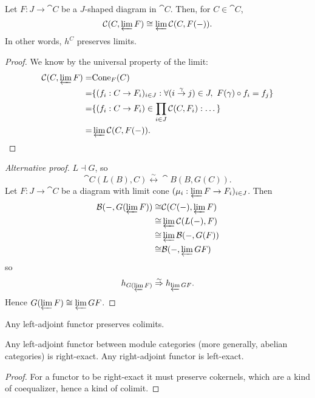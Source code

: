 \documentclass[12pt]{article}
\begin{document}
\begin{lemma}
	Let $F:J\to\cat{C}$ be a $J$-shaped diagram in $\cat{C}$. Then, for $C\in\cat{C}$,
	\begin{equation*}
		\mathcal{C}(C, \varprojlim F)\cong \varprojlim \mathcal{C}(C, F(-)).
	\end{equation*}
	In other words, $h^C$ preserves limits.
\end{lemma}
\begin{proof}
	We know by the universal property of the limit:
	\begin{align*}
		\mathcal{C}(C, \varprojlim F)
		=& \text{Cone}_F(C) \\
		=& \{(f_i:C\to F_i)_{i\in J} : \forall(i \overset{\gamma}{\to}j)\in J,\ F(\gamma)\circ f_i=f_j \} \\
		=& \{(f_i:C\to F_i)\in\prod_{i\in J}\mathcal{C}(C, F_i) : \dots \} \\
		=& \varprojlim \mathcal{C}(C, F(-)).
	\end{align*}
\end{proof}

\begin{proof}[Alternative proof]
	$L\dashv G$, so 
	\begin{equation*}
		\cat{C}(L(B), C) \overset{\sim}{\leftrightarrow} \cat{B}(B, G(C)).
	\end{equation*}
	Let $F:J\to\cat{C}$ be a diagram with limit cone $(\mu_i: \varprojlim F\to F_i)_{i\in J}$. Then 
	\begin{align*}
		\mathcal{B}(-, G(\varprojlim F)) 
		\cong& \mathcal{C}(C(-), \varprojlim F) \\
		\cong& \varprojlim \mathcal{C}(L(-), F) \\
		\cong& \varprojlim \mathcal{B}(-, G(F)) \\
		\cong& \mathcal{B}(-, \varprojlim GF)
	\end{align*}
	so 
	\begin{equation*}
		h_{G(\varprojlim F)} \overset{\sim}{\Rightarrow} h_{\varprojlim GF}.
	\end{equation*}
	Hence $G(\varprojlim F)\cong\varprojlim GF$.
\end{proof}

\begin{proposition}
	Any left-adjoint functor preserves colimits.
\end{proposition}

\begin{proposition}
	Any left-adjoint functor between module categories (more generally, abelian categories) is right-exact. Any right-adjoint functor is left-exact.
\end{proposition}
\begin{proof}
	For a functor to be right-exact it must preserve cokernels, which are a kind of coequalizer, hence a kind of colimit.
\end{proof}
\end{document}

